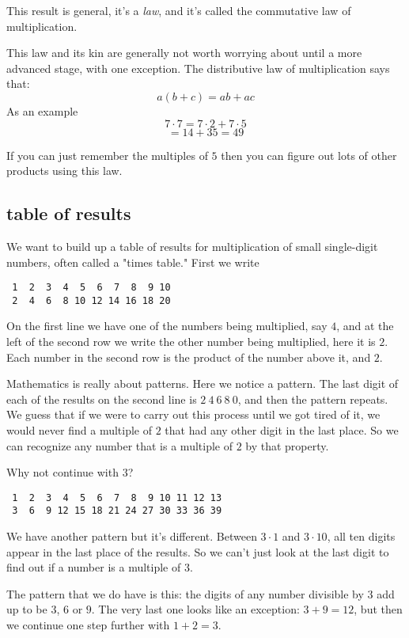 \documentclass[11pt, oneside]{article}
\begin{document}
This result is general, it's a \emph{law}, and it's called the commutative law of multiplication.

This law and its kin are generally not worth worrying about until a more advanced stage, with one exception.  The distributive law of multiplication says that:
\[ a(b + c) = ab + ac \]
As an example
\[ 7 \cdot 7 = 7 \cdot 2 + 7 \cdot 5 \]
\[ = 14 + 35 = 49 \]

If you can just remember the multiples of $5$ then you can figure out lots of other products using this law.

\subsection*{table of results}

We want to build up a table of results for multiplication of small single-digit numbers, often called a "times table."  First we write

\begin{verbatim}
 1  2  3  4  5  6  7  8  9 10
 2  4  6  8 10 12 14 16 18 20
\end{verbatim}

On the first line we have one of the numbers being multiplied, say $4$, and at the left of the second row we write the other number being multiplied, here it is $2$.  Each number in the second row is the product of the number above it, and $2$.

Mathematics is really about patterns.  Here we notice a pattern.  The last digit of each of the results on the second line is $2\  4\  6\  8\  0$, and then the pattern repeats.  We guess that if we were to carry out this process until we got tired of it, we would never find a multiple of $2$ that had any other digit in the last place.  So we can recognize any number that is a multiple of $2$ by that property.

Why not continue with $3$?
\begin{verbatim}
 1  2  3  4  5  6  7  8  9 10 11 12 13
 3  6  9 12 15 18 21 24 27 30 33 36 39
\end{verbatim}

We have another pattern but it's different.  Between $3 \cdot 1$ and $3 \cdot 10$, all ten digits appear in the last place of the results.  So we can't just look at the last digit to find out if a number is a multiple of $3$.  

The pattern that we do have is this:  the digits of any number divisible by $3$ add up to be $3$, $6$ or $9$.  The very last one looks like an exception:  $3 + 9 = 12$, but then we continue one step further with $1 + 2 = 3$.  
\end{document}
